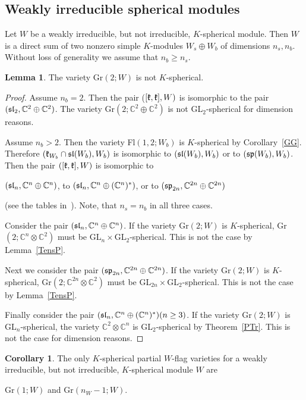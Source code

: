 \documentclass[12pt]{amsart}
\theoremstyle{definition}\newtheorem{theorem}{Theorem}[section]
\newtheorem{lemma}[proposition]{Lemma}
\newtheorem{corollary}[proposition]{Corollary}
\theoremstyle{definition}\newtheorem{definition}[proposition]{Definition}
\theoremstyle{remark}\newtheorem{example}[proposition]{Example}
\begin{document}
\subsection{Weakly irreducible spherical modules} Let $W$ be a weakly irreducible, but not irreducible, $K$-spherical module. Then $W$ is a direct sum of two nonzero simple $K$-modules $W_s\oplus W_b$ of dimensions $n_s, n_b$. Without loss of generality we assume that $n_b\ge n_s$.
\begin{lemma} The variety Gr$(2; W)$ is not $K$-spherical.\end{lemma}
\begin{proof} Assume $n_b=2$. Then the pair ($[\frak k, \frak k], W)$ is isomorphic to the pair $(\frak{sl}_2, \mathbb C^2\oplus\mathbb C^2)$. The variety Gr$(2; \mathbb C^2\oplus\mathbb C^2)$ is not GL$_2$-spherical for dimension reasons.

Assume $n_b>2$. Then the variety Fl$(1,2; W_b)$ is $K$-spherical by Corollary~\ref{GG}. Therefore $(\frak k_{W_b}\cap\frak{sl}(W_b), W_b)$ is isomorphic to $(\frak{sl}(W_b), W_b)$ or to $(\frak{sp}(W_b), W_b)$. Then the pair $([\frak k, \frak k], W)$ is isomorphic to \begin{center}$(\frak{sl}_n, \mathbb C^n\oplus\mathbb C^n)$, to $(\frak{sl}_n, \mathbb C^n\oplus(\mathbb C^n)^*)$, or to $(\frak{sp}_{2n}, \mathbb C^{2n}\oplus\mathbb C^{2n})$\end{center} (see the tables in~\cite{BR}). Note, that $n_s=n_b$ in all three cases.

Consider the pair $(\frak{sl}_n,\mathbb C^n\oplus\mathbb C^n)$. If the variety Gr$(2; W)$ is $K$-spherical, Gr$(2; \mathbb C^n\otimes\mathbb C^2)$ must be GL$_n\times$GL$_2$-spherical. This is not the case by Lemma~\ref{TensP}.

Next we consider the pair $(\frak{sp}_{2n}, \mathbb C^{2n}\oplus\mathbb C^{2n})$. If the variety Gr$(2; W)$ is $K$-spherical, Gr$(2; \mathbb C^{2n}\otimes\mathbb C^2)$ must be GL$_{2n}\times$GL$_2$-spherical. This is not the case by Lemma~\ref{TensP}.

Finally consider the pair $(\frak{sl}_n,\mathbb C^n\oplus(\mathbb C^n)^*) (n \ge 3)$. If the variety Gr$(2;W)$ is GL$_n$-spherical, the variety $\mathbb C^2\otimes\mathbb C^n$ is GL$_2$-spherical by Theorem~\ref{PTr}. This is not the case for dimension reasons.\end{proof}
\begin{corollary}\label{DecG} The only $K$-spherical partial $W$-flag varieties for a weakly irreducible, but not irreducible, $K$-spherical module $W$ are \begin{center}Gr$(1; W)$ and Gr$(n_W-1; W)$.\end{center}\end{corollary}
\end{document}
